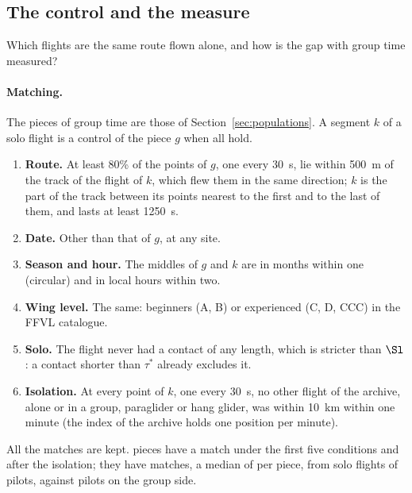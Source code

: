 \subsection{The control and the measure}\label{sec:matching}

Which flights are the same route flown alone, and how is the gap with group time measured?

\paragraph{Matching.} The pieces of group time are those of Section~\ref{sec:populations}. A segment
$k$ of a solo flight is a control of the piece $g$ when all hold.
\begin{enumerate}[label=(\roman*)]
  \item \textbf{Route.} At least 80\% of the points of $g$, one every 30~s, lie within 500~m of the
        track of the flight of $k$, which flew them in the same direction; $k$ is the part of the track
        between its points nearest to the first and to the last of them, and lasts at least 1250~s.
  \item \textbf{Date.} Other than that of $g$, at any site.
  \item \textbf{Season and hour.} The middles of $g$ and $k$ are in months within one (circular) and
        in local hours within two.
  \item \textbf{Wing level.} The same: beginners (A, B) or experienced (C, D, CCC) in the FFVL
        catalogue.
  \item \textbf{Solo.} The flight never had a contact of any length, which is stricter than $\Sl$:
        a contact shorter than $\tau^*$ already excludes it.
  \item \textbf{Isolation.} At every point of $k$, one every 30~s, no other flight of the archive,
        alone or in a group, paraglider or hang glider, was within 10~km within one minute (the index
        of the archive holds one position per minute).
\end{enumerate}
All the matches are kept. \IsoPiecesBefore{} pieces have a match under the first five conditions
and \IsoPieces{} after the isolation; they have \IsoMatches{} matches, a median of \IsoMedianMatches{}
per piece, from \IsoSolo{} solo flights of \IsoPilotsControl{} pilots, against \IsoPilotsGroup{} pilots
on the group side.

